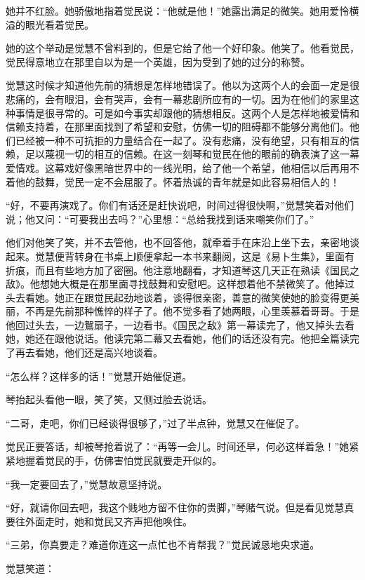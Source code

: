 \par 她并不红脸。她骄傲地指着觉民说：“他就是他！”她露出满足的微笑。她用爱怜横溢的眼光看着觉民。
\par 她的这个举动是觉慧不曾料到的，但是它给了他一个好印象。他笑了。他看觉民，觉民得意地立在那里自以为是一个英雄，因为受到了她的过分的称赞。
\par 觉慧这时候才知道他先前的猜想是怎样地错误了。他以为这两个人的会面一定是很悲痛的，会有眼泪，会有哭声，会有一幕悲剧所应有的一切。因为在他们的家里这种事情是很寻常的。可是如今事实却跟他的猜想相反。这两个人是怎样地被爱情和信赖支持着，在那里面找到了希望和安慰，仿佛一切的阻碍都不能够分离他们。他们已经被一种不可抗拒的力量结合在一起了。没有悲痛，没有绝望，只有相互的信赖，足以蔑视一切的相互的信赖。在这一刻琴和觉民在他的眼前的确表演了这一幕爱情戏。这幕戏好像黑暗世界中的一线光明，给了他一个希望，他相信以后再用不着他的鼓舞，觉民一定不会屈服了。怀着热诚的青年就是如此容易相信人的！
\par “好，不要再演戏了。你们有话还是赶快说吧，时间过得很快啊，”觉慧笑着对他们说；他又问：“可要我出去吗？”心里想：“总给我找到话来嘲笑你们了。”
\par 他们对他笑了笑，并不去管他，也不回答他，就牵着手在床沿上坐下去，亲密地谈起来。觉慧便背转身在书桌上顺便拿起一本书来翻阅，这是《易卜生集》，里面有折痕，而且有些地方加了密圈。他注意地翻看，才知道琴这几天正在熟读《国民之敌》。他想她大概是在那里面寻找鼓舞和安慰吧。这样想着他不禁微笑了。他掉过头去看她。她正在跟觉民起劲地谈着，谈得很亲密，善意的微笑使她的脸变得更美丽，不再是先前那种憔悴的样子了。他不觉多看了她两眼，心里羡慕着哥哥。于是他回过头去，一边鴽扇子，一边看书。《国民之敌》第一幕读完了，他又掉头去看她，她还在跟他说话。他读完第二幕又去看她，他们的话还没有完。他把全篇读完了再去看她，他们还是高兴地谈着。
\par “怎么样？这样多的话！”觉慧开始催促道。
\par 琴抬起头看他一眼，笑了笑，又侧过脸去说话。
\par “二哥，走吧，你们已经谈得很够了，”过了半点钟，觉慧又在催促了。
\par 觉民正要答话，却被琴抢着说了：“再等一会儿。时间还早，何必这样着急！”她紧紧地握着觉民的手，仿佛害怕觉民就要走开似的。
\par “我一定要回去了，”觉慧故意坚持说。
\par “好，就请你回去吧，我这个贱地方留不住你的贵脚，”琴赌气说。但是看见觉慧真要往外面走时，她和觉民又齐声把他唤住。
\par “三弟，你真要走？难道你连这一点忙也不肯帮我？”觉民诚恳地央求道。
\par 觉慧笑道：

